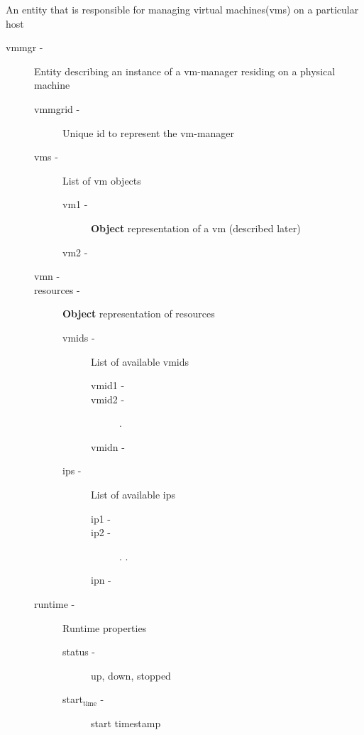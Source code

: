 \documentclass[11pt]{article}
\begin{document}
     An entity that is responsible for managing virtual machines(vms)
     on a particular host
\begin{description}
\item [vmmgr -] Entity describing an instance of a vm-manager
                   residing on a physical machine

\begin{description}
\item [vmmgrid -] Unique id to represent the vm-manager
\item [vms -] List of vm objects

\begin{description}
\item [vm1 -] \textbf{Object} representation of a vm (described later)
\item [vm2 -]
\end{description}

\item [vmn -]
\item [resources -] \textbf{Object} representation of resources

\begin{description}
\item [vmids -] List of available vmids

\begin{description}
\item [vmid1 -]
\item [vmid2 -]
                       .
\item [vmidn -]
\end{description}

\item [ips -] List of available ips

\begin{description}
\item [ip1 -]
\item [ip2 -]
                       .
                       .
\item [ipn -]
\end{description}

\end{description}

\item [runtime -] Runtime properties

\begin{description}
\item [status -] up, down, stopped
\item [start$_{\mathrm{time}}$ -] start timestamp
\end{description}

\end{description}

\end{description}
\end{document}
